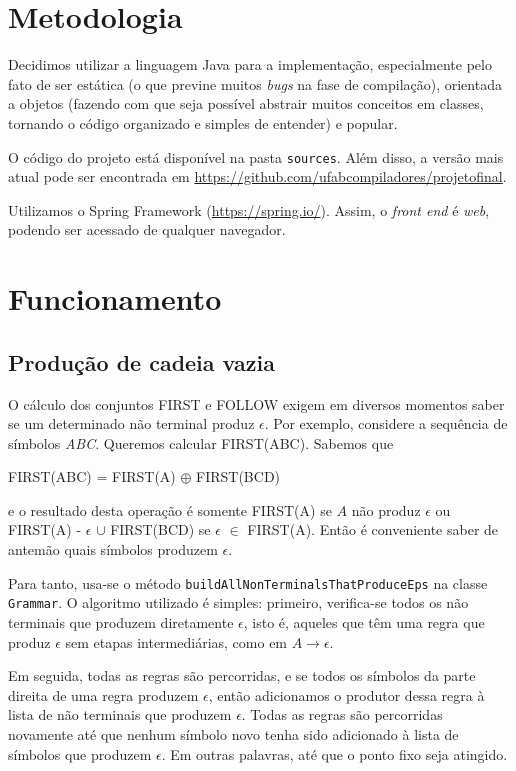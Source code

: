 \documentclass[11pt]{article}
\begin{document}
\section{Metodologia}
\label{sec:orgheadline5}
Decidimos utilizar a linguagem Java para a implementação, especialmente pelo
fato de ser estática (o que previne muitos \emph{bugs} na fase de compilação),
orientada a objetos (fazendo com que seja possível abstrair muitos conceitos em
classes, tornando o código organizado e simples de entender) e popular.

O código do projeto está disponível na pasta \texttt{sources}. Além disso, a versão
mais atual pode ser encontrada em \url{https://github.com/ufabcompiladores/projetofinal}.

Utilizamos o Spring Framework (\url{https://spring.io/}). Assim, o \emph{front end} é
\emph{web}, podendo ser acessado de qualquer navegador.

\section{Funcionamento}
\label{sec:orgheadline14}
\subsection{Produção de cadeia vazia}
\label{sec:orgheadline6}
O cálculo dos conjuntos FIRST e FOLLOW exigem em diversos momentos saber se
um determinado não terminal produz \(\epsilon\). Por exemplo, considere a sequência
de símbolos \emph{ABC}. Queremos calcular FIRST(ABC). Sabemos que

\begin{center}
FIRST(ABC) = FIRST(A) \(\oplus\) FIRST(BCD)
\end{center}

e o resultado desta operação é somente FIRST(A) se \(A\) não produz \(\epsilon\) ou
FIRST(A) - \(\epsilon\) \(\cup\) FIRST(BCD) se \(\epsilon\) \(\in\) FIRST(A). Então é conveniente saber de
antemão quais símbolos produzem \(\epsilon\).

Para tanto, usa-se o método \texttt{buildAllNonTerminalsThatProduceEps} na classe
\texttt{Grammar}. O algoritmo utilizado é simples: primeiro, verifica-se todos os não
terminais que produzem diretamente \(\epsilon\), isto é, aqueles que têm uma regra
que produz \(\epsilon\) sem etapas intermediárias, como em \(A \rightarrow \epsilon\).

Em seguida, todas as regras são percorridas, e se todos os símbolos da parte
direita de uma regra produzem \(\epsilon\), então adicionamos o produtor dessa regra
à lista de não terminais que produzem \(\epsilon\). Todas as regras são percorridas
novamente até que nenhum símbolo novo tenha sido adicionado à lista de símbolos
que produzem \(\epsilon\). Em outras palavras, até que o ponto fixo seja atingido.
\end{document}
